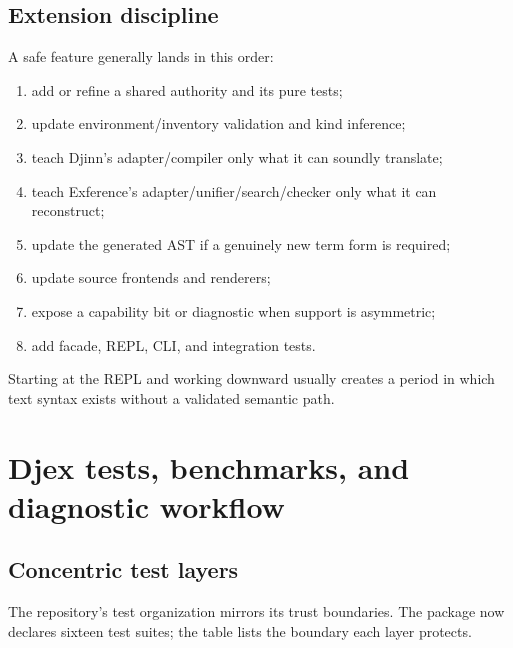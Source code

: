 \documentclass[10pt,letterpaper,oneside]{report}
\begin{document}
\section{Extension discipline}

A safe feature generally lands in this order:

\begin{enumerate}
  \item add or refine a shared authority and its pure tests;
  \item update environment/inventory validation and kind inference;
  \item teach Djinn's adapter/compiler only what it can soundly translate;
  \item teach Exference's adapter/unifier/search/checker only what it can reconstruct;
  \item update the generated AST if a genuinely new term form is required;
  \item update source frontends and renderers;
  \item expose a capability bit or diagnostic when support is asymmetric;
  \item add facade, REPL, CLI, and integration tests.
\end{enumerate}

Starting at the REPL and working downward usually creates a period in which text syntax exists without a validated semantic path.

\chapter{Djex tests, benchmarks, and diagnostic workflow}\label{ch:djex-tests}

\section{Concentric test layers}

The repository's test organization mirrors its trust boundaries. The package now declares sixteen test suites; the table lists the boundary each layer protects.
\end{document}

